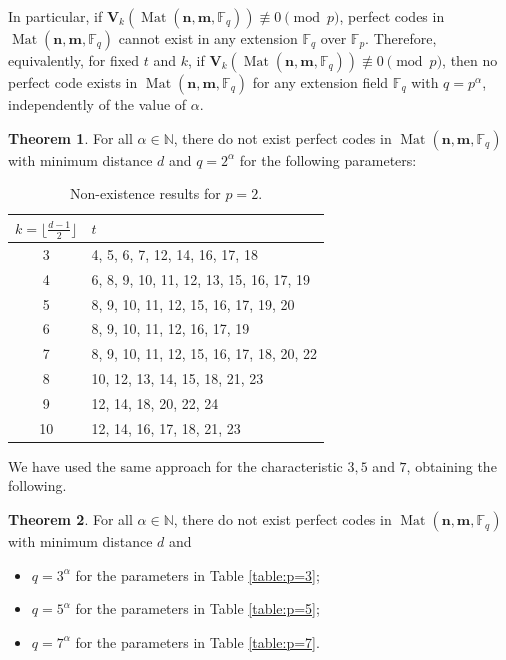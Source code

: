 \documentclass[11pt]{amsart}
\DeclareMathOperator{\Mat}{Mat}
\theoremstyle{definition}
\newtheorem{theorem}{Theorem}[section]
\newcommand{\F}{{\mathbb F}}
\newcommand{\bfn}{\mathbf {n}}
\newcommand{\bfm}{\mathbf {m}}
\newcommand{\fq}{{\mathbb F}_{q}}
\newcommand{\spacmn}{\Mat(\bfn,\bfm,\F_q)}
\begin{document}
In particular, if $\mathbf{V}_k(\spacmn)\not\equiv 0 \pmod{p}$, perfect codes in $\spacmn$ cannot exist in any extension $\fq$ over $\F_p$. Therefore, equivalently, for fixed $t$ and $k$, if $\mathbf{V}_k(\spacmn)\not\equiv 0 \pmod p$, then no perfect code exists in $\spacmn$ for any extension field $\mathbb{F}_q$ with $q = p^\alpha$, independently of the value of $\alpha$.

\begin{theorem}
    For all $\alpha \in \mathbb{N}$, there do not exist perfect codes in $\spacmn$ with minimum distance $d$ and $q=2^\alpha$ for the following parameters:
    \begin{table}[ht] 
    \centering
    \label{table:p=2}
    \begin{tabular}{|c|p{}|}
	\hline
	$k=\lfloor \frac{d-1}2\rfloor$ & $t$ \\
	\hline
	3 & 4, 5, 6, 7, 12, 14, 16, 17, 18 \\
	\hline
	4 & 6, 8, 9, 10, 11, 12, 13, 15, 16, 17, 19 \\
	\hline
	5 & 8, 9, 10, 11, 12, 15, 16, 17, 19, 20 \\
	\hline
	6 & 8, 9, 10, 11, 12, 16, 17, 19 \\
	\hline
	7 & 8, 9, 10, 11, 12, 15, 16, 17, 18, 20, 22 \\
	\hline
	8 & 10, 12, 13, 14, 15, 18, 21, 23 \\
	\hline
	9 & 12, 14, 18, 20, 22, 24 \\
	\hline
	10 & 12, 14, 16, 17, 18, 21, 23 \\
	\hline
\end{tabular}
    \caption{Non-existence results for $p=2$.}
\end{table}
\end{theorem}

We have used the same approach for the characteristic $3,5$ and $7$, obtaining the following.

\begin{theorem}
    For all $\alpha \in \mathbb{N}$, there do not exist perfect codes in $\spacmn$ with minimum distance $d$ and 
    \begin{itemize}
         \item $q=3^\alpha$ for the parameters in Table \ref{table:p=3};
         \item $q=5^\alpha$ for the parameters in Table \ref{table:p=5};
         \item $q=7^\alpha$ for the parameters in Table \ref{table:p=7}.
    \end{itemize}
\end{theorem}
\end{document}
